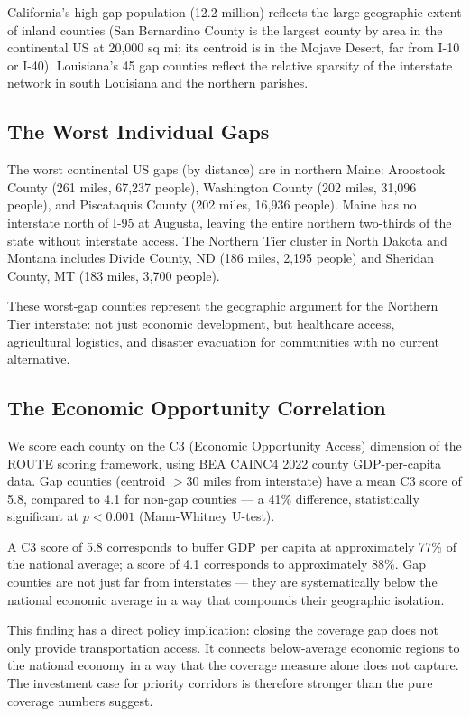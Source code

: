 California's high gap population (12.2 million) reflects the large geographic extent of inland counties (San Bernardino County is the largest county by area in the continental US at 20,000 sq mi; its centroid is in the Mojave Desert, far from I-10 or I-40). Louisiana's 45 gap counties reflect the relative sparsity of the interstate network in south Louisiana and the northern parishes.

\subsection{The Worst Individual Gaps}

The worst continental US gaps (by distance) are in northern Maine: Aroostook County (261 miles, 67,237 people), Washington County (202 miles, 31,096 people), and Piscataquis County (202 miles, 16,936 people). Maine has no interstate north of I-95 at Augusta, leaving the entire northern two-thirds of the state without interstate access. The Northern Tier cluster in North Dakota and Montana includes Divide County, ND (186 miles, 2,195 people) and Sheridan County, MT (183 miles, 3,700 people).

These worst-gap counties represent the geographic argument for the Northern Tier interstate: not just economic development, but healthcare access, agricultural logistics, and disaster evacuation for communities with no current alternative.

\subsection{The Economic Opportunity Correlation}

We score each county on the C3 (Economic Opportunity Access) dimension of the ROUTE scoring framework, using BEA CAINC4 2022 county GDP-per-capita data. Gap counties (centroid $> 30$ miles from interstate) have a mean C3 score of 5.8, compared to 4.1 for non-gap counties --- a 41\% difference, statistically significant at $p < 0.001$ (Mann-Whitney U-test).

A C3 score of 5.8 corresponds to buffer GDP per capita at approximately 77\% of the national average; a score of 4.1 corresponds to approximately 88\%. Gap counties are not just far from interstates --- they are systematically below the national economic average in a way that compounds their geographic isolation.

This finding has a direct policy implication: closing the coverage gap does not only provide transportation access. It connects below-average economic regions to the national economy in a way that the coverage measure alone does not capture. The investment case for priority corridors is therefore stronger than the pure coverage numbers suggest.
